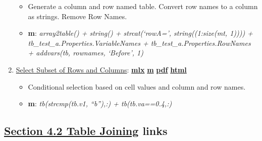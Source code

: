 \documentclass[
]{book}
\providecommand{\tightlist}{%
  \setlength{\itemsep}{0pt}\setlength{\parskip}{0pt}}
\begin{document}
\begin{enumerate}
  \begin{itemize}
  \tightlist
  \item
    Generate a column and row named table. Convert row names to a column as strings. Remove Row Names.
  \item
    \textbf{m}: \emph{array2table() + string() + strcat(`rowA=', string((1:size(mt, 1)))) + tb\_test\_a.Properties.VariableNames + tb\_test\_a.Properties.RowNames + addvars(tb, rownames, `Before', 1)}
  \end{itemize}
\item
  \href{https://fanwangecon.github.io/M4Econ/table/main/htmlpdfm/fs_tab_select_rows_cols.html}{Select Subset of Rows and Columns}: \href{https://github.com/FanWangEcon/M4Econ/blob/master/table/main/fs_tab_select_rows_cols.mlx}{\textbf{mlx}} \textbar{} \href{https://github.com/FanWangEcon/M4Econ/blob/master/table/main/htmlpdfm/fs_tab_select_rows_cols.m}{\textbf{m}} \textbar{} \href{https://github.com/FanWangEcon/M4Econ/blob/master/table/main/htmlpdfm/fs_tab_select_rows_cols.pdf}{\textbf{pdf}} \textbar{} \href{https://fanwangecon.github.io/M4Econ/table/main/htmlpdfm/fs_tab_select_rows_cols.html}{\textbf{html}}

  \begin{itemize}
  \tightlist
  \item
    Conditional selection based on cell values and column and row names.
  \item
    \textbf{m}: \emph{tb(strcmp(tb.v1, ``b''),:) + tb(tb.va==0.4,:)}
  \end{itemize}
\end{enumerate}

\hypertarget{section-4.2-table-joiningtable-joining-links}{%
\subsection{\texorpdfstring{\protect\hyperlink{table-joining}{Section 4.2 Table Joining} links}{Section 4.2 Table Joining links}}\label{section-4.2-table-joiningtable-joining-links}}
\end{document}
